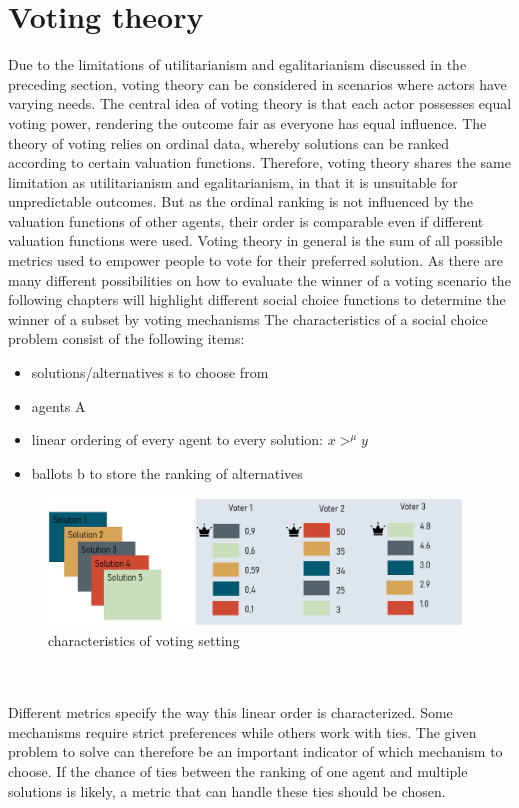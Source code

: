 \documentclass[german, a4paper, 11pt, oneside]{scrbook}
\begin{document}
\section{Voting theory}
Due to the limitations of utilitarianism and egalitarianism discussed in the preceding section, voting theory can be considered in scenarios where actors have varying needs.  The central idea of voting theory is that each actor possesses equal voting power, rendering the outcome fair as everyone has equal influence. The theory of voting relies on ordinal data, whereby solutions can be ranked according to certain valuation functions. \cite{Bhavnani.2022b}   Therefore, voting theory shares the same limitation as utilitarianism and egalitarianism, in that it is unsuitable for unpredictable outcomes. But as the ordinal ranking is not influenced by the valuation functions of other agents, their order is comparable even if different valuation functions were used. Voting theory in general is the sum of all possible metrics used to empower people to vote for their preferred solution. As there are many different possibilities on how to evaluate the winner of a voting scenario the following chapters will highlight different social choice functions to determine the winner of a subset by voting mechanisms \cite{FelixBrandtVincentConitzerUlleEndrissJeromeLangandArielD.Procaccia.} The characteristics of a social choice problem consist of the following items: 
\begin{itemize}
  \item solutions/alternatives s to choose from
  \item agents A
  \item linear ordering of every agent to every solution:  $x>^\mu y$
  \item ballots b to store the ranking of alternatives 
\end{itemize}\cite{FelixBrandtVincentConitzerUlleEndrissJeromeLangandArielD.Procaccia.}
\begin{figure}[h]
\centering
\includegraphics[height=3.4cm]{Voting_setting}
\caption{characteristics of voting setting}
\end{figure}
\\\\Different metrics specify the way this linear order is characterized. Some mechanisms require strict preferences while others work with ties. The given problem to solve can therefore be an important indicator of which mechanism to choose.\cite{FelixBrandtVincentConitzerUlleEndrissJeromeLangandArielD.Procaccia.} If the chance of ties between the ranking of one agent and multiple solutions is likely, a metric that can handle these ties should be chosen.
\end{document}
